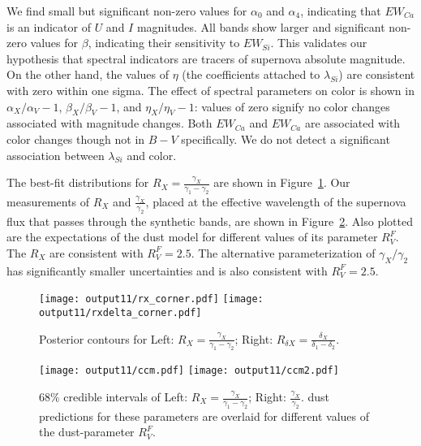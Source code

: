 \documentclass{aastex}   	%
\begin{document}
We find small but significant non-zero values for $\alpha_0$ and $\alpha_4$, indicating that $EW_{Ca}$ is an indicator of $U$ and $I$
magnitudes.  All bands show larger and significant non-zero values for $\beta$, indicating their sensitivity to
$EW_{Si}$.  This validates our hypothesis that spectral indicators
are tracers of supernova absolute magnitude.  On the other hand, the values of $\eta$ (the coefficients attached to $\lambda_{Si}$) are consistent with zero within one sigma.
The effect of spectral parameters on color is shown in $\alpha_X/\alpha_V-1$,  $\beta_X/\beta_V-1$, and  $\eta_X/\eta_V-1$:
values of zero signify no color changes associated with magnitude changes.
Both $EW_{Ca}$ and $EW_{Ca}$ are associated with color changes though not in $B-V$ specifically.
We do not detect a significant association between
$\lambda_{Si}$ and color.

The best-fit distributions for $R_X=\frac{\gamma_X}{\gamma_1-\gamma_2}$ are shown in Figure~\ref{rx:fig}.  
Our measurements of
$R_X$ and $\frac{\gamma_X}{\gamma_2}$, placed at the effective wavelength of the supernova flux that passes
through the synthetic bands, are shown in
Figure~\ref{ccm:fig}.
Also plotted are the expectations of the \citet{1999PASP..111...63F} dust model for different values of its parameter $R^F_V$.
The $R_X$ are consistent with  $R^F_V=2.5$.  The 
 alternative parameterization
 of $\gamma_X/\gamma_2$ has significantly smaller
uncertainties and is also consistent with $R^F_V=2.5$. 

\begin{figure}[htbp] %
   \centering
   \texttt{[image: output11/rx\_corner.pdf]}
      \texttt{[image: output11/rxdelta\_corner.pdf]} 
   \caption{Posterior contours for Left:  $R_X=\frac{\gamma_X}{\gamma_1-\gamma_2}$;  Right:  $R_{\delta X}=\frac{\delta_X}{\delta_1-\delta_2}$.
   \label{rx:fig}}
\end{figure}

\begin{figure}[htbp] %
   \centering
   \texttt{[image: output11/ccm.pdf]}
      \texttt{[image: output11/ccm2.pdf]} 
   \caption{68\% credible intervals of Left: $R_X=\frac{\gamma_X}{\gamma_1-\gamma_2}$; Right: $\frac{\gamma_X}{\gamma_2}$. 
   \citet{1999PASP..111...63F} dust
   predictions for these parameters are overlaid for different values of the dust-parameter $R^F_V$.
   \label{ccm:fig}}
\end{figure}
\end{document}
